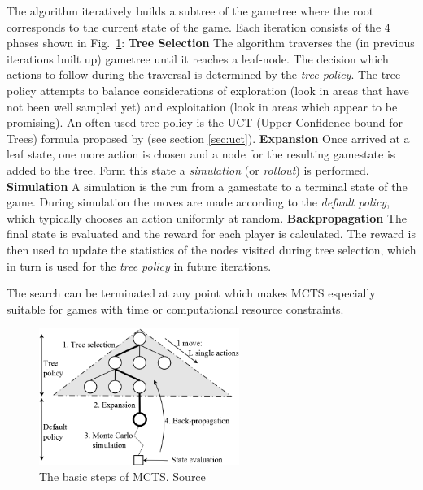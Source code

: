 The algorithm iteratively builds a subtree of the gametree where the root corresponds to the current state of the game. Each iteration consists of the 4 phases shown in Fig.~\ref{fig:mcts_phases}:
\newline\textbf{Tree Selection} The algorithm traverses the (in previous iterations built up) gametree until it reaches a leaf-node. The decision which actions to follow during the traversal is determined by the \textit{tree policy}. The tree policy attempts to balance considerations of exploration (look in areas that have not been well sampled yet) and exploitation (look in areas which appear to be promising).
An often used tree policy is the UCT (Upper Confidence bound for Trees) formula proposed by \cite{uct} (see section \ref{sec:uct}).
\newline\textbf{Expansion} Once arrived at a leaf state, one more action is chosen and a node for the resulting gamestate is added to the tree. Form this state a \textit{simulation} (or \textit{rollout}) is performed.
\newline\textbf{Simulation} A simulation is the run from a gamestate to a terminal state of the game. During simulation the moves are made according to the \textit{default policy}, which typically chooses an action uniformly at random.
\newline\textbf{Backpropagation} The final state is evaluated and the reward for each player is calculated. The reward is then used to update the statistics of the nodes visited during tree selection, which in turn is used for the \textit{tree policy} in future iterations.

The search can be terminated at any point which makes MCTS especially suitable for games with time or computational resource constraints.

\begin{figure}[h]
    \begin{center}
      \includegraphics[width=0.58\textwidth]{images/basic_mcts_process.png}
      \caption[Basic MCTS process]
      {The basic steps of MCTS. Source \cite{perez13}}
      \label{fig:mcts_phases}
    \end{center}
\end{figure}


